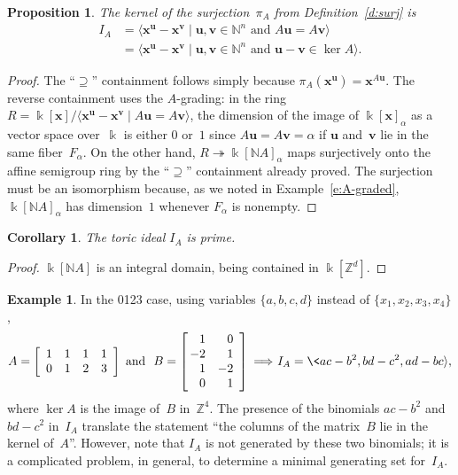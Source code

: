 \documentclass[12pt]{amsart}
\numberwithin{equation}{section}
\newtheorem{prop}[thm]{Proposition}
\newtheorem{cor}[thm]{Corollary}
\theoremstyle{definition}
\newtheorem{example}[thm]{Example}
\begin{document}
\begin{prop}
The kernel of the surjection~$\pi_A$ from Definition~\ref{d:surj} is
\begin{align*}
  I_A &= {\langle}{\mathbf{x}}^{\mathbf{u}}-{\mathbf{x}}^{\mathbf{v}} \mid {\mathbf{u}},{\mathbf{v}}\in{\mathbb{N}}^n\text{ and }A{\mathbf{u}} = A{\mathbf{v}}{\rangle}
\\    &= {\langle}{\mathbf{x}}^{\mathbf{u}}-{\mathbf{x}}^{\mathbf{v}} \mid {\mathbf{u}},{\mathbf{v}}\in{\mathbb{N}}^n\text{ and }{\mathbf{u}}-{\mathbf{v}}\in \ker A{\rangle}.
\end{align*}
\end{prop}
\begin{proof}
The ``$\supseteq$'' containment follows simply because $\pi_A({\mathbf{x}}^{\mathbf{u}})
= {\mathbf{x}}^{A{\mathbf{u}}}$.  The reverse containment uses the $A$-grading: in the
ring $R = {\Bbbk}[{\mathbf{x}}]/{\langle}{\mathbf{x}}^{\mathbf{u}}-{\mathbf{x}}^{\mathbf{v}}\mid A{\mathbf{u}}=A{\mathbf{v}}{\rangle}$, the dimension
of the image of ${\Bbbk}[{\mathbf{x}}]_\alpha$ as a vector space over~${\Bbbk}$ is
either $0$ or~$1$ since $A{\mathbf{u}} = A{\mathbf{v}} = \alpha$ if ${\mathbf{u}}$ and~${\mathbf{v}}$ lie
in the same fiber~$F_\alpha$.  On the other hand, $R {\twoheadrightarrow} {\Bbbk}[{\mathbb{N}}
A]_\alpha$ maps surjectively onto the affine semigroup ring by the
``$\supseteq$'' containment already proved.  The surjection must be an
isomorphism because, as we noted in Example~\ref{e:A-graded}, ${\Bbbk}[{\mathbb{N}}
A]_\alpha$ has dimension~$1$ whenever $F_\alpha$ is nonempty.
\end{proof}

\begin{cor}
The \emph{toric ideal} $I_A$ is prime.
\end{cor}
\begin{proof}
${\Bbbk}[{\mathbb{N}} A]$ is an integral domain, being contained in ${\Bbbk}[{\mathbb{Z}}^d]$.
\end{proof}

\begin{example}\label{e:0123'}
In the 0123 case, using variables $\{a,b,c,d\}$ instead of
$\{x_1,x_2,x_3,x_4\}$,
$$  A =
  \left[
  \begin{array}{cccc}
	 1 & 1 & 1 & 1 \\
	 0 & 1 & 2 & 3
       \end{array}
  \right]
  \text{ and }\
  B =
  \left[
  \begin{array}{@{\,}rr}
	 1 & 0 \\
	-2 & 1 \\
	 1 &-2 \\
	 0 & 1 
       \end{array}
  \right]
  \ {\Longrightarrow}\
  I_A = \<ac-b^2,bd-c^2,ad-bc{\rangle},
$$
where $\ker A$ is the image of~$B$ in~${\mathbb{Z}}^4$.  The presence of the
binomials $ac-b^2$ and $bd-c^2$ in~$I_A$ translate the statement ``the
columns of the matrix~$B$ lie in the kernel of~$A$''.  However, note
that $I_A$ is not generated by these two binomials; it is a
complicated problem, in general, to determine a minimal generating set
for~$I_A$.
\end{example}
\end{document}
